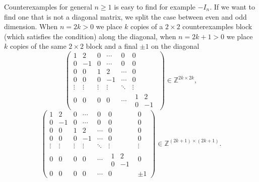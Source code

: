 \documentclass[11pt, a4paper, oneside]{article}
\theoremstyle{remark}
\theoremstyle{lemma}
\begin{document}
Counterexamples for general $n\geq 1$ is easy to find for example $-I_n$. If we want to find one that is not a diagonal matrix, we split the case between even and odd dimension. When $n=2k>0$ we place \( k \) copies of a \( 2 \times 2 \) counterexamples block (which satisfies the condition) along the diagonal, when $n=2k+1>0$  we place \( k \) copies of the same \( 2 \times 2 \) block and a final $\pm1$ on the diagonal
\[
\begin{pmatrix}
1 & 2 & 0 & \cdots & 0 & 0 \\
0 & -1 & 0 & \cdots & 0 & 0 \\
0 & 0 & 1 & 2 & \cdots & 0 \\
0 & 0 & 0 & -1 & \cdots & 0 \\
\vdots & \vdots & \vdots & \vdots & \ddots & \vdots \\
0 & 0 & 0 & 0 & \cdots & \begin{matrix} 1 & 2 \\ 0 & -1 \end{matrix}
\end{pmatrix} \in \mathbb{Z}^{2k \times 2k},
\]
\[
\begin{pmatrix}
1 & 2 & 0 & \cdots & 0 & 0 & 0 \\
0 & -1 & 0 & \cdots & 0 & 0 & 0 \\
0 & 0 & 1 & 2 & \cdots & 0 & 0 \\
0 & 0 & 0 & -1 & \cdots & 0 & 0 \\
\vdots & \vdots & \vdots & \vdots & \ddots & \vdots & \vdots \\
0 & 0 & 0 & 0 & \cdots & \begin{matrix} 1 & 2 \\ 0 & -1 \end{matrix} & 0 \\
0 & 0 & 0 & 0 & \cdots & 0 & \pm 1
\end{pmatrix} \in \mathbb{Z}^{(2k+1) \times (2k+1)}.
\]
\appendix
\newpage
\section{}
\end{document}
